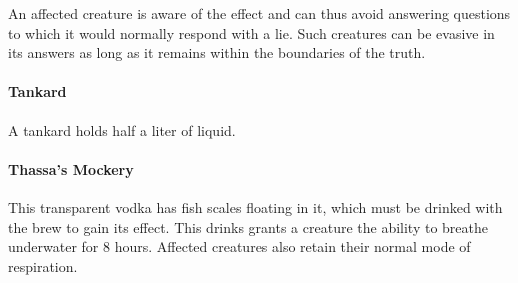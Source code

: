     An affected creature is aware of the effect and can thus avoid answering questions to which it would normally respond with a lie.
    Such creatures can be evasive in its answers as long as it remains within the boundaries of the truth.
\paragraph{Tankard}
    A tankard holds half a liter of liquid.
\paragraph{Thassa's Mockery} %
    This transparent vodka has fish scales floating in it, which must be drinked with the brew to gain its effect.
    This drinks grants a creature the ability to breathe underwater for 8 hours.
    Affected creatures also retain their normal mode of respiration.
